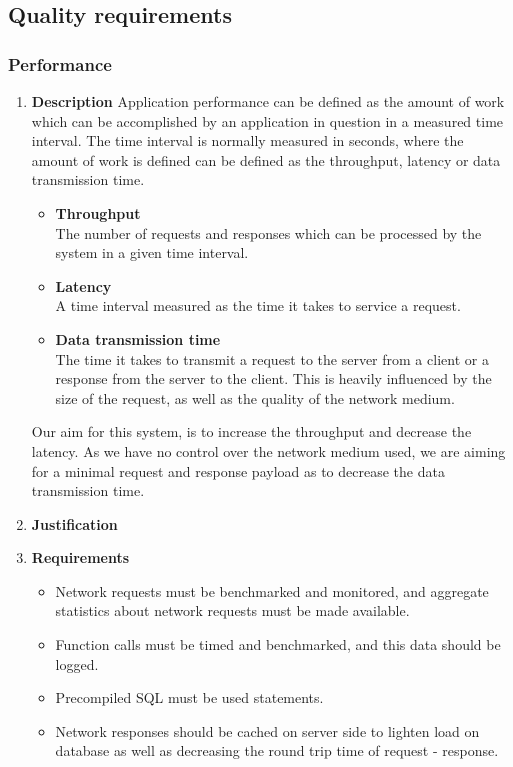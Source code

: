 \documentclass[a4paper,10pt]{article}
\begin{document}
\subsection{Quality requirements}
\subsubsection{Performance}
\begin{enumerate}
\item \textbf{Description}
Application performance can be defined as the amount of work which can be accomplished by an application in question in a measured time interval. The time interval is normally measured in seconds, where the amount of work is defined can be defined as the throughput, latency or data transmission time.
	\begin{itemize}
		\item \textbf{Throughput} \\
		The number of requests and responses which can be processed by the system in a given time interval.
		\item \textbf{Latency} \\
		A time interval measured as the time it takes to service a request. 
		\item \textbf{Data transmission time} \\
		The time it takes to transmit a request to the server from a client or a response from the server to the client. This is heavily influenced by the size of the request, as well as the quality of the network medium.
	\end{itemize}
	
	Our aim for this system, is to increase the throughput and decrease the latency. As we have no control over the network medium used, we are aiming for a minimal request and response payload as to decrease the data transmission time.
\item \textbf{Justification}
\item \textbf{Requirements}
	\begin{itemize}
		\item Network requests must be benchmarked and monitored, and aggregate statistics about network requests must be made available.
		\item Function calls must be timed and benchmarked, and this data should be logged.
		\item Precompiled SQL must be used statements.
		\item Network responses should be cached on server side to lighten load on database as well as decreasing the round trip time of request - response.
		\end{itemize}
\end{enumerate}
\end{document}
